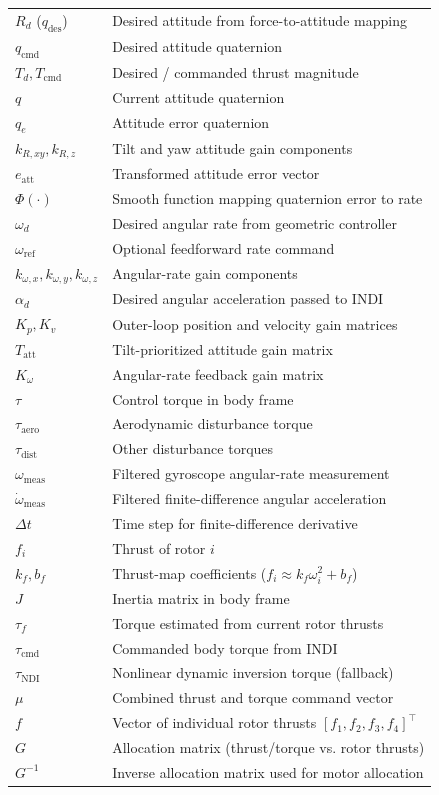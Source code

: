 \begin{longtable}{ll}
$R_d$ ($q_{\mathrm{des}}$) & Desired attitude from force-to-attitude mapping \\
$q_{\mathrm{cmd}}$ & Desired attitude quaternion \\
$T_d, T_{\mathrm{cmd}}$ & Desired / commanded thrust magnitude \\
$q$ & Current attitude quaternion \\
$q_e$ & Attitude error quaternion \\
$k_{R,xy}, k_{R,z}$ & Tilt and yaw attitude gain components \\
$e_{\mathrm{att}}$ & Transformed attitude error vector \\
$\Phi(\cdot)$ & Smooth function mapping quaternion error to rate \\
$\omega_d$ & Desired angular rate from geometric controller \\
$\omega_{\mathrm{ref}}$ & Optional feedforward rate command \\
$k_{\omega,x}, k_{\omega,y}, k_{\omega,z}$ & Angular-rate gain components \\
$\alpha_d$ & Desired angular acceleration passed to INDI \\
$K_p, K_v$ & Outer-loop position and velocity gain matrices \\
$T_{\mathrm{att}}$ & Tilt-prioritized attitude gain matrix \\
$K_\omega$ & Angular-rate feedback gain matrix \\
$\tau$ & Control torque in body frame \\
$\tau_{\mathrm{aero}}$ & Aerodynamic disturbance torque \\
$\tau_{\mathrm{dist}}$ & Other disturbance torques \\
$\omega_{\mathrm{meas}}$ & Filtered gyroscope angular-rate measurement \\
$\dot{\omega}_{\mathrm{meas}}$ & Filtered finite-difference angular acceleration \\
$\Delta t$ & Time step for finite-difference derivative \\
$f_i$ & Thrust of rotor $i$ \\
$k_f, b_f$ & Thrust-map coefficients ($f_i \approx k_f \omega_i^2 + b_f$) \\
$J$ & Inertia matrix in body frame \\
$\tau_f$ & Torque estimated from current rotor thrusts \\
$\tau_{\mathrm{cmd}}$ & Commanded body torque from INDI \\
$\tau_{\mathrm{NDI}}$ & Nonlinear dynamic inversion torque (fallback) \\
$\mu$ & Combined thrust and torque command vector \\
$f$ & Vector of individual rotor thrusts $[f_1, f_2, f_3, f_4]^\top$ \\
$G$ & Allocation matrix (thrust/torque vs. rotor thrusts) \\
$G^{-1}$ & Inverse allocation matrix used for motor allocation \\
\end{longtable}

